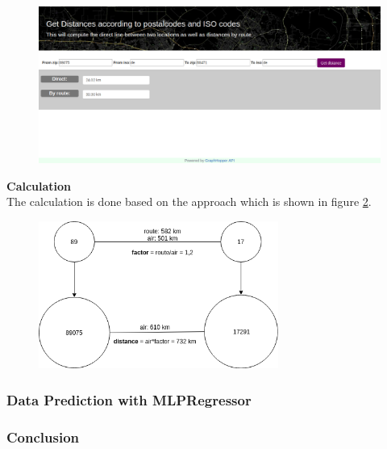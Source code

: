 \documentclass[12pt]{article}
\begin{document}
\begin{figure}[H]
\hspace{-2.0cm}
\includegraphics[width=1.3\textwidth]{img/webapp}
\label{fig:webapp}
\end{figure}
\noindent\textbf{Calculation}\\
The calculation is done based on the approach which is shown in figure \ref{fig:calc}.
\begin{figure}[H]
\centering
\includegraphics[width=0.7\textwidth]{img/calc}
\label{fig:calc}
\end{figure}

\subsubsection{Data Prediction with MLPRegressor}
\subsubsection{Conclusion}
\end{document}
